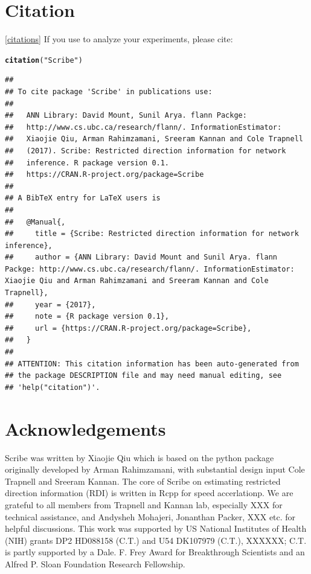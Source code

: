 \documentclass[10pt,oneside]{article}\usepackage[]{graphicx}\usepackage[]{color}
\makeatletter
\newcommand{\hlstr}[1]{\textcolor[rgb]{0.192,0.494,0.8}{#1}}%
\newcommand{\hlstd}[1]{\textcolor[rgb]{0.345,0.345,0.345}{#1}}%
\newcommand{\hlkwd}[1]{\textcolor[rgb]{0.737,0.353,0.396}{\textbf{#1}}}%
\newenvironment{kframe}{%
 \def\at@end@of@kframe{}%
 \ifinner\ifhmode%
  \def\at@end@of@kframe{\end{minipage}}%
  \begin{minipage}{\columnwidth}%
 \fi\fi%
 \def\FrameCommand##1{\hskip\@totalleftmargin \hskip-\fboxsep
 \colorbox{shadecolor}{##1}\hskip-\fboxsep
     \hskip-\linewidth \hskip-\@totalleftmargin \hskip\columnwidth}%
 \MakeFramed {\advance\hsize-\width
   \@totalleftmargin\z@ \linewidth\hsize
   \@setminipage}}%
 {\par\unskip\endMakeFramed%
 \at@end@of@kframe}
\newenvironment{knitrout}{}{} %
\makeatother
\begin{document}
 \section{Citation}\ref{citations}
 If you use  to analyze your experiments, please cite:
\begin{knitrout}
\color{fgcolor}\begin{kframe}
\begin{alltt}
\hlkwd{citation}\hlstd{(}\hlstr{"Scribe"}\hlstd{)}
\end{alltt}
\begin{verbatim}
## 
## To cite package 'Scribe' in publications use:
## 
##   ANN Library: David Mount, Sunil Arya. flann Packge:
##   http://www.cs.ubc.ca/research/flann/. InformationEstimator:
##   Xiaojie Qiu, Arman Rahimzamani, Sreeram Kannan and Cole Trapnell
##   (2017). Scribe: Restricted direction information for network
##   inference. R package version 0.1.
##   https://CRAN.R-project.org/package=Scribe
## 
## A BibTeX entry for LaTeX users is
## 
##   @Manual{,
##     title = {Scribe: Restricted direction information for network inference},
##     author = {ANN Library: David Mount and Sunil Arya. flann Packge: http://www.cs.ubc.ca/research/flann/. InformationEstimator: Xiaojie Qiu and Arman Rahimzamani and Sreeram Kannan and Cole Trapnell},
##     year = {2017},
##     note = {R package version 0.1},
##     url = {https://CRAN.R-project.org/package=Scribe},
##   }
## 
## ATTENTION: This citation information has been auto-generated from
## the package DESCRIPTION file and may need manual editing, see
## 'help("citation")'.
\end{verbatim}
\end{kframe}
\end{knitrout}

 \section{Acknowledgements}

Scribe was written by Xiaojie Qiu which is based on the python package originally developed by Arman Rahimzamani, with substantial design input Cole Trapnell and Sreeram Kannan. The core of Scribe on estimating restricted direction information (RDI) is written in Rcpp for speed accerlationp. We are grateful to all members from Trapnell and Kannan lab, especially XXX for technical assistance, and Andysheh Mohajeri, Jonanthan Packer, XXX etc. for helpful discussions. This work was supported by  US National Institutes of Health (NIH) grants DP2 HD088158 (C.T.) and U54 DK107979 (C.T.), XXXXXX; C.T. is partly supported by a Dale. F. Frey Award for Breakthrough Scientists and an Alfred P. Sloan Foundation Research Fellowship.
\end{document}
